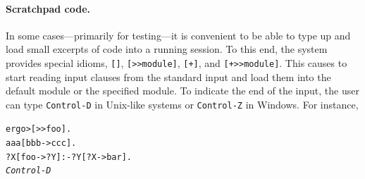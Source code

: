 \documentclass[11pt]{article}
\newcommand{\ERGO}{\mbox{\smaller{\ensuremath{\cal{E}}\smaller{{\sc{RGO}}}}}\xspace}
\newcommand{\FLSYSTEM}{\ERGO}
\newcommand{\prompt}{ergo> }
\newcommand{\comment}[1]{}
\begin{document}
\comment{
The 4-place version of \texttt{isloaded} also leads to
the following very useful idiom. Suppose one has files \texttt{foo}   and
\texttt{bar} in the same directory \texttt{dir}.
The file \texttt{foo} is loaded and it
in turn needs to add \texttt{bar}. One could write something like this:
\begin{alltt}
    \emph{In file foo}:  
           ....
           ?- [+bar].
           ....
\end{alltt}
Unfortunately, this version is not portable because, if \texttt{bar} is a
local name then \texttt{foo} must be loaded when the current directory is
\texttt{dir} --- a serious limitation. Indeed, since \texttt{bar} is a
local name, the add command will not find \texttt{bar} (or will find a
wrong bar), if the current directory is not \texttt{dir}.
Writing \texttt{bar} as an absolute name is even worse. Yes, this will not
be directory-dependent, but only for the author of the above snippet.
Giving this snippet to a different user (who might have a different
directory structure) or moving the snippet, say, from Windows to Linux will
require editing and changing the name each time. It is generally considered
unprofessional (and unacceptable commercially) to depend on full path names.
The \texttt{isloaded} primitive to the rescue:
\begin{verbatim}
    ?- isloaded{?FullFile,\@,\@F,?},
       File[dirname(?FullFile)->?Dir]@\io,
       \symbol[concat([?Dir,bar]) -> ?BarFullName]@\basetype,
       [+?BarFullName].
\end{verbatim}
The remaining ingredients of this recipe are self-explanatory, but look
them up in this manual if they are not.
}


\paragraph{Scratchpad code.}
In some cases---primarily for testing---it is convenient to be able to type
up and load small excerpts of code into a running \FLSYSTEM session.
To this end, the system provides special idioms, \verb|[]|,
\verb|[>>module]|, \verb|[+]|, and \verb|[+>>module]|. This causes
\FLSYSTEM to start reading input clauses
from the standard input and load them into the default module or the
specified module. To indicate the end of the input, the user can type
{\tt Control-D} in Unix-like systems or {\tt Control-Z} in Windows.  
For instance,

\begin{alltt}
 \prompt [>{}>foo].
 aaa[bbb->ccc].
 ?X[foo->?Y] :- ?Y[?X->bar].
 \emph{Control-D}  
\end{alltt}
\end{document}
